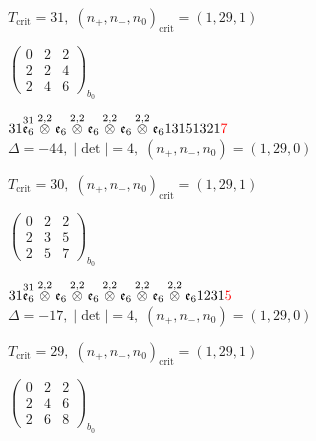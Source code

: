 \documentclass[10pt]{article}
\begin{document}
\hspace{1em}$T_{\text{crit}}=31,\; (n_+,n_-,n_0)_{\text{crit}}=(1,29,1)$

\hspace{2em}$\left(\begin{smallmatrix}0 & 2 & 2 \\ 2 & 2 & 4 \\ 2 & 4 & 6\end{smallmatrix}\right)_{\!b_0}$

$31\overset{31}{\mathfrak{e}_6}\overset{2,2}{\otimes}\mathfrak{e}_6\overset{2,2}{\otimes}\mathfrak{e}_6\overset{2,2}{\otimes}\mathfrak{e}_6\overset{2,2}{\otimes}\mathfrak{e}_613151321\textcolor{red}{7}$ \quad $\Delta=-44,\; |\det|=4,\; (n_+,n_-,n_0)=(1,29,0)$

\hspace{1em}$T_{\text{crit}}=30,\; (n_+,n_-,n_0)_{\text{crit}}=(1,29,1)$

\hspace{2em}$\left(\begin{smallmatrix}0 & 2 & 2 \\ 2 & 3 & 5 \\ 2 & 5 & 7\end{smallmatrix}\right)_{\!b_0}$

\smallskip

$31\overset{31}{\mathfrak{e}_6}\overset{2,2}{\otimes}\mathfrak{e}_6\overset{2,2}{\otimes}\mathfrak{e}_6\overset{2,2}{\otimes}\mathfrak{e}_6\overset{2,2}{\otimes}\mathfrak{e}_6\overset{2,2}{\otimes}\mathfrak{e}_61231\textcolor{red}{5}$ \quad $\Delta=-17,\; |\det|=4,\; (n_+,n_-,n_0)=(1,29,0)$

\hspace{1em}$T_{\text{crit}}=29,\; (n_+,n_-,n_0)_{\text{crit}}=(1,29,1)$

\hspace{2em}$\left(\begin{smallmatrix}0 & 2 & 2 \\ 2 & 4 & 6 \\ 2 & 6 & 8\end{smallmatrix}\right)_{\!b_0}$

\smallskip
\end{document}
